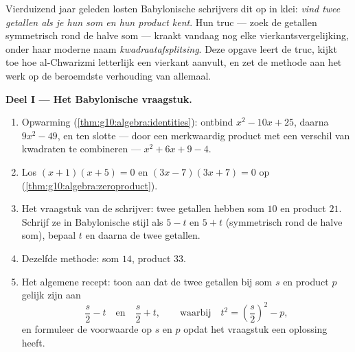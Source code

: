 \begin{problem}[{Weekendopgave --- som-en-productvraagstukken, het kwadraat
aanvullen zoals al-Chwarizmi het tekende, en de vergelijking
$x^2 = x + 1$}]
\label{pb:g10:algebra:1}
Vierduizend jaar geleden losten Babylonische schrijvers dit op in klei:
\emph{vind twee getallen als je hun som en hun product kent}. Hun truc ---
zoek de getallen symmetrisch rond de halve som --- kraakt vandaag nog elke
vierkantsvergelijking, onder haar moderne naam \emph{kwadraatafsplitsing}.
Deze opgave leert de truc, kijkt toe hoe al-Chwarizmi letterlijk een vierkant
aanvult, en zet de methode aan het werk op de beroemdste verhouding van
allemaal.

\medskip
\noindent\textbf{Deel I --- Het Babylonische vraagstuk.}
\begin{enumerate}
  \item Opwarming (\cref{thm:g10:algebra:identities}): ontbind
        $x^2 - 10x + 25$, daarna $9x^2 - 49$, en ten slotte --- door een
        merkwaardig product met een verschil van kwadraten te combineren ---
        $x^2 + 6x + 9 - 4$.
  \item Los $(x + 1)(x + 5) = 0$ en $(3x - 7)(3x + 7) = 0$ op
        (\cref{thm:g10:algebra:zeroproduct}).
  \item Het vraagstuk van de schrijver: twee getallen hebben som $10$ en
        product $21$. Schrijf ze in Babylonische stijl als $5 - t$ en
        $5 + t$ (symmetrisch rond de halve som), bepaal $t$ en daarna de twee
        getallen.
  \item Dezelfde methode: som $14$, product $33$.
  \item Het algemene recept: toon aan dat de twee getallen bij som $s$ en
        product $p$ gelijk zijn aan
        \[
        \frac s2 - t
        \quad\text{en}\quad
        \frac s2 + t,
        \qquad\text{waarbij}\quad
        t^2 = \left(\frac s2\right)^2 - p ,
        \]
        en formuleer de voorwaarde op $s$ en $p$ opdat het vraagstuk een
        oplossing heeft.
\end{enumerate}


\end{problem}
